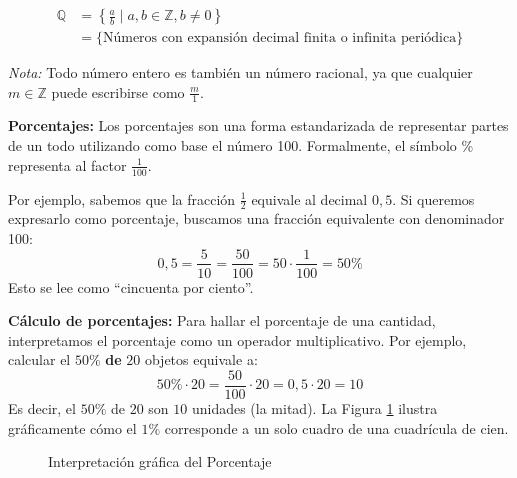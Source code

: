 \begin{enumerate}
\begin{align}
    \mathbb{Q} &= \left\{\frac{a}{b} \mid a,b\in\mathbb{Z}, b\neq 0\right\} \\
               &= \{\text{Números con expansión decimal finita o infinita periódica}\}
\end{align}

\textit{Nota:} Todo número entero es también un número racional, ya que cualquier $m \in \mathbb{Z}$ puede escribirse como $\frac{m}{1}$.


\textbf{Porcentajes:} Los porcentajes son una forma estandarizada de representar partes de un todo utilizando como base el número 100. Formalmente, el símbolo \% representa al factor $\frac{1}{100}$.

Por ejemplo, sabemos que la fracción $\frac{1}{2}$ equivale al decimal $0,5$. Si queremos expresarlo como porcentaje, buscamos una fracción equivalente con denominador 100:
\[ 0,5 = \frac{5}{10} = \frac{50}{100} = 50 \cdot \frac{1}{100} = 50\% \]
Esto se lee como ``cincuenta por ciento''.


\textbf{Cálculo de porcentajes:} Para hallar el porcentaje de una cantidad, interpretamos el porcentaje como un operador multiplicativo. Por ejemplo, calcular el $50\%$ \textbf{de} $20$ objetos equivale a:
\[ 50\% \cdot 20 = \frac{50}{100} \cdot 20 = 0,5 \cdot 20 = 10 \]
Es decir, el $50\%$ de $20$ son $10$ unidades (la mitad). La Figura \ref{fig:porcentaje100} ilustra gráficamente cómo el $1\%$ corresponde a un solo cuadro de una cuadrícula de cien.

\begin{figure}[ht]
    \centering
    \caption{Interpretación gráfica del Porcentaje}
    \label{fig:porcentaje100}
\end{figure}
\end{enumerate}
